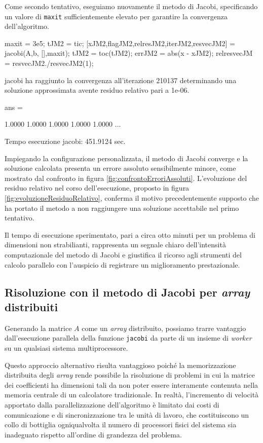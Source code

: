     Come secondo tentativo, eseguiamo nuovamente il metodo di Jacobi, specificando un valore di \lstinline{maxit} sufficientemente elevato per garantire la
    convergenza dell'algoritmo.
    \begin{matlabcode}
    maxit = 3e5;
    tJM2 = tic;
    [xJM2,flagJM2,relresJM2,iterJM2,resvecJM2] = jacobi(A,b,
                                                 [],maxit);
    tJM2 = toc(tJM2);
    errJM2 = abs(x - xJM2);
    relresvecJM = resvecJM2./resvecJM2(1);
    \end{matlabcode}
    \begin{matlaboutput}
    jacobi ha raggiunto la convergenza all'iterazione 210137
    determinando una soluzione approssimata avente residuo
    relativo pari a 1e-06.

    ans =

    1.0000    1.0000    1.0000    1.0000    1.0000    ...
   
    Tempo esecuzione jacobi: 451.9124 sec.
    \end{matlaboutput}
    Impiegando la configurazione personalizzata, il metodo di Jacobi converge e la soluzione calcolata presenta un errore assoluto sensibilmente minore, come
    mostrato dal confronto in figura \ref{fig:confrontoErroriAssoluti}.\newline
    L'evoluzione del residuo relativo nel corso dell'esecuzione, proposto in figura \ref{fig:evoluzioneResiduoRelativo}, conferma il motivo precedentemente supposto che ha portato il metodo a non raggiungere
    una soluzione accettabile nel primo tentativo.

    Il tempo di esecuzione sperimentato, pari a circa otto minuti per un problema di dimensioni non strabilianti, rappresenta un segnale chiaro
    dell'intensit\`a computazionale del metodo di Jacobi e giustifica il ricorso agli strumenti del calcolo parallelo con l'auspicio di registrare un miglioramento prestazionale.
    \subsection{Risoluzione con il metodo di Jacobi per \textit{array} distribuiti}
    Generando la matrice $A$ come un \textit{array} distribuito, possiamo trarre vantaggio dall'esecuzione parallela della funzione \lstinline{jacobi} da parte
di un insieme di \textit{worker} su un qualsiasi sistema multiprocessore.

Questo approccio alternativo risulta vantaggioso poich\'e la memorizzazione distribuita degli \textit{array} rende possibile la risoluzione di problemi in cui la matrice dei coefficienti ha dimensioni
tali da non poter essere interamente contenuta nella memoria centrale di un calcolatore tradizionale.\newline
In realt\`a, l'incremento di velocit\`a apportato dalla parallelizzazione dell'algoritmo \`e limitato dai costi di comunicazione e di sincronizzazione tra le unit\`a di lavoro, che costituiscono un collo di bottiglia ogniqualvolta il numero di processori fisici del sistema sia inadeguato rispetto all'ordine di grandezza del problema.

